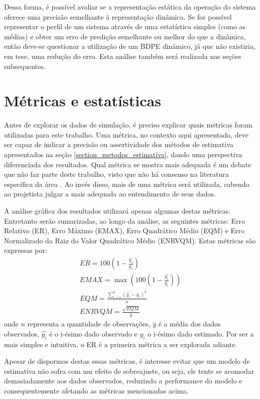 Dessa forma, é possível avaliar se a representação estática da operação do sistema oferece uma precisão semelhante à representação dinâmica. Se for possível representar o perfil de um sistema através de uma estatística simples (como as médias) e obter um erro de predição semelhante ou melhor do que a dinâmica, então deve-se questionar a utilização de um BDPE dinâmico, já que não existiria, em tese, uma redução do erro. Esta análise também será realizada nas seções subsequentes.
\section{Métricas e estatísticas}
\label{section:metricas_estatisticas}
Antes de explorar os dados de simulação, é preciso explicar quais métricas foram utilizadas para este trabalho. Uma métrica, no contexto aqui apresentado, deve ser capaz de indicar a precisão ou assertividade dos métodos de estimativa apresentados na seção \ref{section_metodos_estimativa}, dando uma perspectiva diferenciada dos resultados. Qual métrica se mostra mais adequada é um debate que não faz parte deste trabalho, visto que não há consenso na literatura específica da área \cite{Poli1993}\cite{Willmott}\cite{Chai2014}. Ao invés disso, mais de uma métrica será utilizada, cabendo ao projetista julgar a mais adequada ao entendimento de seus dados.

A análise gráfica dos resultados utilizará apenas algumas destas métricas. Entretanto serão sumarizadas, ao longo da análise, as seguintes métricas: Erro Relativo (ER), Erro Máximo (EMAX), Erro Quadrático Médio (EQM) e Erro Normalizado da Raiz do Valor Quadrático Médio (ENRVQM). Estas métricas são expressas por:
\begin{align}
ER = 100\left(1 - \frac{\hat{y_i}}{y_i}\right) \\
EMAX = \max{\left(100\left(1 - \frac{\hat{y_i}}{y_i}\right)\right)} \\
EQM = \frac{\sum_{i=1}^{n}(\hat{y_i}-y_i)^2}{n} \\
ENRVQM = \frac{\sqrt{EQM}}{\bar{y}}
\end{align}
onde $n$ representa a quantidade de observações, $\bar{y}$ é a média dos dados observados, $\hat{y_i}$ é o i-ésimo dado observado e $y_i$ o i-ésimo dado estimado.
Por ser a mais simples e intuitiva, o ER é a primeira métrica a ser explorada adiante.

Apesar de dispormos destas essas métricas, é interesse evitar que um modelo de estimativa não sofra com um efeito de sobreajuste, ou seja, ele tente se acomodar demasiadamente aos dados observados, reduzindo a performance do modelo e consequentemente afetando as métricas mencionadas acima.

